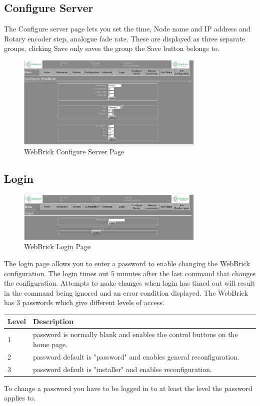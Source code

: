 \subsection{Configure Server}
The Configure server page lets you set the time, Node name and IP address and Rotary encoder step, analogue fade rate.
These are displayed as three separate groups, clicking Save only saves the group the Save button belongs to.

\begin{figure}[H]
\centering
\includegraphics[width=0.8\textwidth]{Images/ConfigureServer.png}
\caption{WebBrick Configure Server Page}
\end{figure}


\subsection{Login}
\begin{figure}[H]
\centering
\includegraphics[width=0.8\textwidth]{Images/login.png}
\caption{WebBrick Login Page}
\end{figure}

The login page allows you to enter a password to enable changing the WebBrick configuration. The
login times out 5 minutes after the last command that changes the configuration. Attempts to make
changes when login has timed out will result in the command being ignored and an error condition displayed. 
The WebBrick has 3 passwords which give different levels of access. 

\begin{tabular}{l|p{12cm}}
Level&Description\\
\hline
1&password is normally blank and enables the control buttons on the home page.\\
2&password default is "password" and enables general reconfiguration.\\
3&password default is "installer" and enables reconfiguration.\\
\end{tabular}

To change a password you have to be logged in to at least the level the password applies to.
